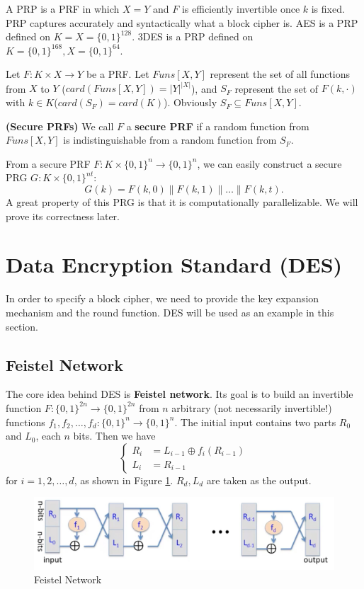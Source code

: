 A PRP is a PRF in which $X=Y$ and $F$ is efficiently invertible once $k$ is fixed. PRP captures accurately and syntactically what a block cipher is. AES is a PRP defined on
$K=X=\{0,1\}^{128}$. 3DES is a PRP defined on $K=\{0,1\}^{168}, X=\{0,1\}^{64}$. 

Let $F:K\times X\rightarrow Y$ be a PRF. Let $Funs[X,Y]$ represent the set of all functions from $X$ to $Y$ ($card(Funs[X,Y])=\lvert Y\rvert^{\lvert X\rvert}$), and $S_F$ represent the set of $F(k,\cdot)$ with $k\in K$($card(S_F)=card(K)$). Obviously $S_F\subseteq Funs[X,Y]$.
\begin{definition}\textbf{(Secure PRFs)}
We call $F$ a \textbf{secure PRF} if a random function from $Funs[X,Y]$ is indistinguishable from a random function from $S_F$.
\end{definition}
From a secure PRF $F:K\times \{0,1\}^n\rightarrow\{0,1\}^n$, we can easily construct a secure PRG $G:K\times\{0,1\}^{nt}$:
\[G(k)=F(k,0)\parallel F(k,1)\parallel\dots\parallel F(k,t).\]
A great property of this PRG is that it is computationally parallelizable. We will prove its correctness later.
\section{Data Encryption Standard (DES)}
In order to specify a block cipher, we need to provide the key expansion mechanism and the round function. DES will be used as an example in this section.
\subsection{Feistel Network}
The core idea behind DES is \textbf{Feistel network}. Its goal is to build an invertible function $F:\{0,1\}^{2n}\rightarrow\{0,1\}^{2n}$ from $n$ arbitrary (not necessarily invertible!) functions $f_1,f_2,\dots,f_d:\{0,1\}^n\rightarrow\{0,1\}^n$. The initial input contains two parts $R_0$ and $L_0$, each $n$ bits. Then we have 
\begin{equation*}\begin{cases}
R_i&=L_{i-1}\oplus f_i(R_{i-1})\\
L_i&=R_{i-1}
\end{cases}\end{equation*}
for $i=1,2,\dots,d$, as shown in Figure \ref{feistel}. $R_d,L_d$ are taken as the output. 
\begin{figure}[ht]
\centering
\includegraphics[width=\textwidth]{feistel.jpg}
\caption{Feistel Network}\label{feistel}
\end{figure}

